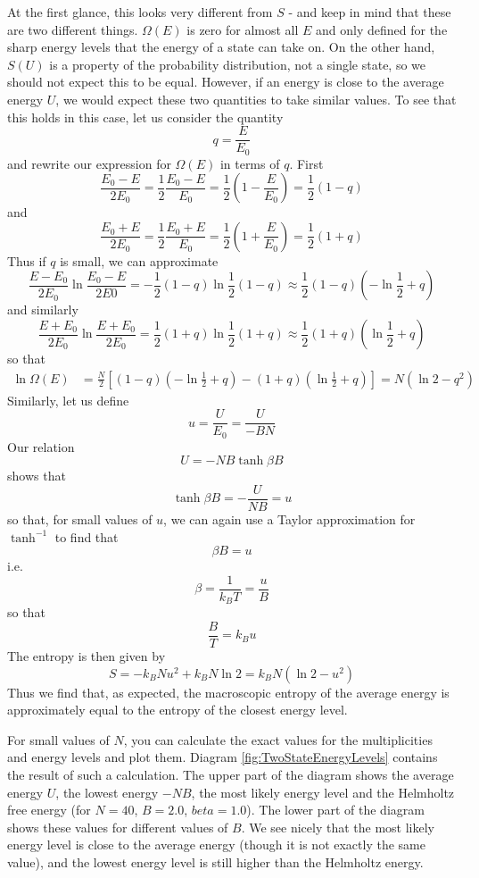 \documentclass[a4paper, draft]{article}
\theoremstyle{own}
\theoremstyle{remark}
\begin{document}
At the first glance, this looks very different from $S$ - and keep in mind that these are two different things. $\Omega(E)$ is zero for almost all $E$ and only defined for the sharp energy levels that the energy of a state can take on. On the other hand, $S(U)$ is a property of the probability distribution, not a single state, so we should not expect this to be equal. However, if an energy is close to the average energy $U$, we would expect these two quantities to take similar values. 	To see that this holds in this case, let us consider the quantity
$$
q = \frac{E}{E_0}
$$
and rewrite our expression for $\Omega(E)$ in terms of $q$. First 
$$
\frac{E_0 - E}{2E_0} = \frac{1}{2} \frac{E_0 - E}{E_0} = \frac{1}{2} (1 - \frac{E}{E_0} ) = \frac{1}{2} (1 - q)
$$
and
$$
\frac{E_0 + E}{2E_0} = \frac{1}{2} \frac{E_0 + E}{E_0} = \frac{1}{2} (1 + \frac{E}{E_0} ) = \frac{1}{2} (1 + q)
$$
Thus if $q$ is small, we can approximate
$$
\frac{E - E_0}{2E_0}\ln \frac{E_0 - E}{2E0} = - \frac{1}{2} (1 - q) \ln \frac{1}{2} (1 - q) \approx  \frac{1}{2} (1 - q) (- \ln \frac{1}{2} + q) 
$$
and similarly
$$
\frac{E + E_0}{2E_0}\ln \frac{E + E_0}{2E_0} = \frac{1}{2} ( 1 + q) \ln \frac{1}{2} ( 1 + q) \approx \frac{1}{2} ( 1 + q) (\ln \frac{1}{2} + q) 
$$
so that
\begin{align*}
\ln \Omega(E) &=   \frac{N}{2} [ (1 - q) (- \ln \frac{1}{2} + q) -  ( 1 + q) (\ln \frac{1}{2} + q)  ] = N ( \ln 2  -  q^2 )
\end{align*}
Similarly, let us define
$$
u = \frac{U}{E_0} = \frac{U}{- B N}
$$
Our relation
$$
U = - N B \tanh \beta B
$$
shows that
$$
\tanh \beta B = - \frac{U}{NB} = u
$$
so that, for small values of $u$, we can again use a Taylor approximation for $\tanh^{-1}$ to find that
$$
\beta B = u
$$
i.e.
$$
\beta = \frac{1}{k_B T} = \frac{u}{B}
$$
so that
$$
\frac{B}{T} = k_B u
$$
The entropy is then given by
$$
S = - k_B N u^2 + k_B N \ln 2 = k_B N (\ln 2 - u^2)   
$$
Thus we find that, as expected, the macroscopic entropy of the average energy is approximately equal to the entropy of the closest energy level. 

For small values of $N$, you can calculate the exact values for the multiplicities and energy levels and plot them. Diagram \ref{fig:TwoStateEnergyLevels} contains the result of such a calculation. The upper part of the diagram shows the average energy $U$, the lowest energy $- N B$, the most likely energy level and the Helmholtz free energy (for $N = 40$, $B = 2.0$, $beta = 1.0$). The lower part of the diagram shows these values for different values of $B$. We see nicely that the most likely energy level is close to the average energy (though it is not exactly the same value), and the lowest energy level is still higher than the Helmholtz energy.
\end{document}
